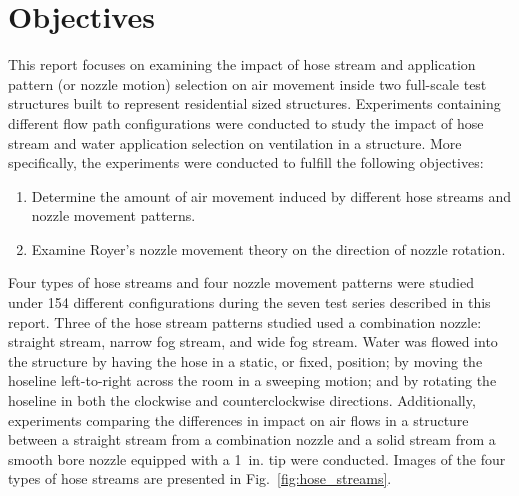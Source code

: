 \documentclass[12pt,oneside]{book}
\begin{document}
\section{Objectives}
\label{sec:objectives}
This report focuses on examining the impact of hose stream and application pattern (or nozzle motion) selection on air movement inside two full-scale test structures built to represent residential sized structures. Experiments containing different flow path configurations were conducted to study the impact of hose stream and water application selection on ventilation in a structure. More specifically, the experiments were conducted to fulfill the following objectives:

\begin{enumerate}
	\item Determine the amount of air movement induced by different hose streams and nozzle movement patterns.
	\item Examine Royer's nozzle movement theory on the direction of nozzle rotation.
\end{enumerate}

Four types of hose streams and four nozzle movement patterns were studied under 154 different configurations during the seven test series described in this report. Three of the hose stream patterns studied used a combination nozzle: straight stream, narrow fog stream, and wide fog stream. Water was flowed into the structure by having the hose in a static, or fixed, position; by moving the hoseline left-to-right across the room in a sweeping motion; and by rotating the hoseline in both the clockwise and counterclockwise directions. Additionally, experiments comparing the differences in impact on air flows in a structure between a straight stream from a combination nozzle and a solid stream from a smooth bore nozzle equipped with a 1~in. tip were conducted. Images of the four types of hose streams are presented in Fig.~\ref{fig:hose_streams}.
\end{document}
